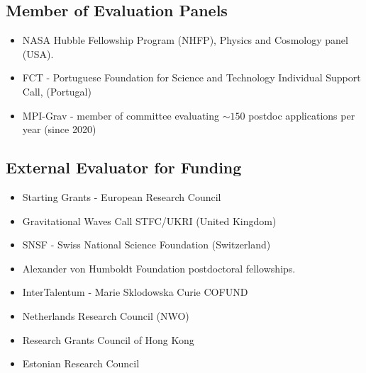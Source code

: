 \documentclass[11pt,a4paper]{article}
\begin{document}
\subsection*{Member of Evaluation Panels}
\begin{itemize}\setlength{\itemsep}{1pt}
\item {NASA Hubble Fellowship Program (NHFP)}, Physics and Cosmology panel (USA). %
\item {FCT} - Portuguese Foundation for Science and Technology Individual Support Call, (Portugal) %
\item MPI-Grav - member of committee evaluating $\sim 150$ postdoc applications per year (since 2020) %
\end{itemize}


\subsection*{External Evaluator for Funding}

\begin{itemize}\setlength{\itemsep}{1pt}
\item {Starting Grants - European Research Council}  
\item {Gravitational Waves Call STFC/UKRI} (United Kingdom)
\item {SNSF} - Swiss National Science Foundation (Switzerland) 
\item {Alexander von Humboldt Foundation} postdoctoral fellowships. 
 \item {InterTalentum - Marie Sklodowska Curie COFUND}
 \item {Netherlands Research Council (NWO)}
 \item Research Grants Council of Hong Kong
 \item {Estonian Research Council}
\end{itemize}
\end{document}
